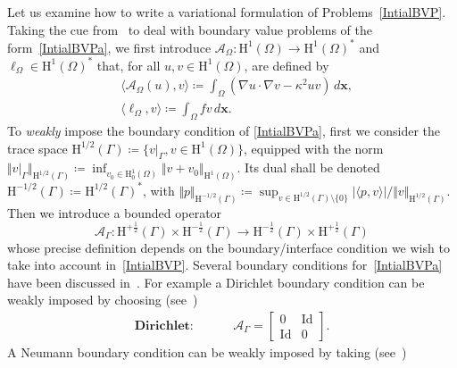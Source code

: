 \documentclass[a4paper,11pt]{article}
\newcommand{\mH}{\mathrm{H}}
\newcommand{\Id}{\mathrm{Id}}
\newcommand{\bx}{\boldsymbol{x}}
\newcommand{\lbr}{\lbrack}
\newcommand{\rbr}{\rbrack}
\begin{document}
Let us examine how to write a variational formulation of Problems~\eqref{IntialBVP}. Taking the cue from~\cite{MR4665035} to deal with
boundary value problems of the form~\eqref{IntialBVPa}, we first
 introduce $\mathcal{A}_{\Omega}\colon \mH^{1}(\Omega)\to
\mH^{1}(\Omega)^*$ and $\ell_{\Omega}\in \mH^{1}(\Omega)^*$ that, for
all $u,v\in \mH^{1}(\Omega)$, are defined by
\begin{equation}\label{HelmholtzOperator}
  \begin{aligned}
    & \langle \mathcal{A}_{\Omega}(u),v\rangle \coloneq
    \int_{\Omega}(\nabla u\cdot\nabla v  -\kappa^{2} u v)\,d\bx,\\
    & \langle \ell_{\Omega},v\rangle\coloneq\int_{\Omega}f v \,d\bx.
  \end{aligned}
\end{equation}
To \emph{weakly} impose the boundary condition of \eqref{IntialBVPa}, first we consider the trace space
$\mH^{1/2}(\Gamma)\coloneq\{v\vert_{\Gamma}, v\in \mH^{1}(\Omega)\}$,
equipped with the norm $\Vert
v\vert_{\Gamma}\Vert_{\mH^{1/2}(\Gamma)}\coloneq \inf_{v_0\in
  \mH^{1}_0(\Omega)}\Vert v+v_0\Vert_{\mH^{1}(\Omega)}$. Its dual
shall be denoted $\mH^{-1/2}(\Gamma)\coloneq
\mH^{1/2}(\Gamma)^*$, with $\Vert
p\Vert_{\mH^{-1/2}(\Gamma)}\coloneq \sup_{v\in
  \mH^{1/2}(\Gamma)\setminus\{0\}} \vert \langle p,v\rangle\vert/
\Vert v\Vert_{\mH^{1/2}(\Gamma)}$. Then
we introduce a bounded operator
\begin{equation*}
  \mathcal{A}_\Gamma\colon \mH^{+\frac{1}{2}}(\Gamma)\times \mH^{-\frac{1}{2}}(\Gamma)\to
    \mH^{-\frac{1}{2}}(\Gamma)\times \mH^{+\frac{1}{2}}(\Gamma)
\end{equation*}
whose precise definition depends on the boundary/interface condition we
wish to take into account in~\eqref{IntialBVP}. Several boundary
conditions for~\eqref{IntialBVPa} have been discussed in~\cite{MR4665035}. For example
a Dirichlet boundary condition can be weakly imposed by choosing (see~\cite[Example 3.1]{MR4665035})
\begin{align}\label{DirichletBC}
  \textbf{Dirichlet:}\hspace{1cm} &
  \mathcal{A}_{\Gamma} =
  \left\lbr\begin{array}{cc}
  0 & \Id\\
  \Id & 0
  \end{array}\right\rbr.
\end{align}
A Neumann boundary condition can be weakly imposed by taking (see~\cite[Example 3.2]{MR4665035})
\end{document}
